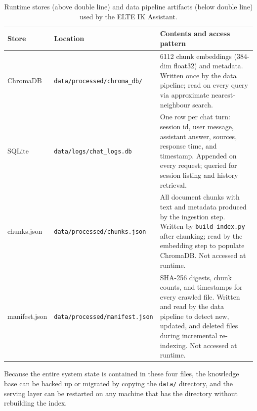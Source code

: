 \begin{table}[H]
    \centering
    \begin{tabular}{|l|l|p{}|}
        \hline
        \textbf{Store} & \textbf{Location} & \textbf{Contents and access pattern} \\
        \hline\hline
        ChromaDB & \texttt{data/processed/chroma\_db/} &
            6112 chunk embeddings (384-dim float32) and metadata.
            Written once by the data pipeline; read on every query
            via approximate nearest-neighbour search. \\
        \hline
        SQLite & \texttt{data/logs/chat\_logs.db} &
            One row per chat turn: session id, user message, assistant
            answer, sources, response time, and timestamp.
            Appended on every request; queried for session listing
            and history retrieval. \\
        \hline\hline
        chunks.json & \texttt{data/processed/chunks.json} &
            All document chunks with text and metadata produced by
            the ingestion step. Written by \texttt{build\_index.py}
            after chunking; read by the embedding step to populate
            ChromaDB. Not accessed at runtime. \\
        \hline
        manifest.json & \texttt{data/processed/manifest.json} &
            SHA-256 digests, chunk counts, and timestamps for every
            crawled file. Written and read by the data pipeline to
            detect new, updated, and deleted files during incremental
            re-indexing. Not accessed at runtime. \\
        \hline
    \end{tabular}
    \caption{Runtime stores (above double line) and data pipeline
             artifacts (below double line) used by the ELTE IK Assistant.}
    \label{tab:storage}
\end{table}

Because the entire system state is contained in these four files, the
knowledge base can be backed up or migrated by copying the
\texttt{data/} directory, and the serving layer can be restarted on
any machine that has the directory without rebuilding the index.

